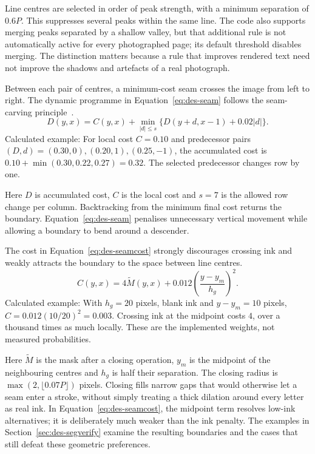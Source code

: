 Line centres are selected in order of peak strength, with a minimum separation of $0.6P$. This suppresses several peaks within the same line. The code also supports merging peaks separated by a shallow valley, but that additional rule is not automatically active for every photographed page; its default threshold disables merging. The distinction matters because a rule that improves rendered text need not improve the shadows and artefacts of a real photograph.~\cite[segment.py]{braunepipeline2026}

Between each pair of centres, a minimum-cost seam crosses the image from left to right. The dynamic programme in Equation~\ref{eq:des-seam} follows the seam-carving principle~\cite[PDF p.~3, Sec.~3]{avidan2007}.
\begin{equation}
D(y,x)=C(y,x)+\min_{|d|\leq s}
\{D(y+d,x-1)+0.02|d|\}.
\label{eq:des-seam}
\end{equation}
Calculated example: For local cost $C=0.10$ and predecessor pairs $(D,d)=(0.30,0),(0.20,1),(0.25,-1)$, the accumulated cost is $0.10+\min(0.30,0.22,0.27)=0.32$. The selected predecessor changes row by one. \cite[segment.py, LeastCostSeam]{braunepipeline2026}

Here $D$ is accumulated cost, $C$ is the local cost and $s=7$ is the allowed row change per column. Backtracking from the minimum final cost returns the boundary. Equation~\ref{eq:des-seam} penalises unnecessary vertical movement while allowing a boundary to bend around a descender.~\cite[segment.py]{braunepipeline2026}

The cost in Equation~\ref{eq:des-seamcost} strongly discourages crossing ink and weakly attracts the boundary to the space between line centres.
\begin{equation}
C(y,x)=4\widetilde M(y,x)
+0.012\left(\frac{y-y_m}{h_g}\right)^2.
\label{eq:des-seamcost}
\end{equation}
Calculated example: With $h_g=20$ pixels, blank ink and $y-y_m=10$ pixels, $C=0.012(10/20)^2=0.003$. Crossing ink at the midpoint costs $4$, over a thousand times as much locally. These are the implemented weights, not measured probabilities. \cite[segment.py, SeamCuts]{braunepipeline2026}

Here $\widetilde M$ is the mask after a closing operation, $y_m$ is the midpoint of the neighbouring centres and $h_g$ is half their separation. The closing radius is $\max(2,\lfloor0.07P\rfloor)$ pixels. Closing fills narrow gaps that would otherwise let a seam enter a stroke, without simply treating a thick dilation around every letter as real ink. In Equation~\ref{eq:des-seamcost}, the midpoint term resolves low-ink alternatives; it is deliberately much weaker than the ink penalty. The examples in Section~\ref{sec:des-segverify} examine the resulting boundaries and the cases that still defeat these geometric preferences.~\cite[segment.py]{braunepipeline2026}

